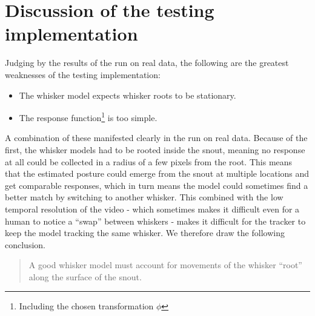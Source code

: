


\section{Discussion of the testing implementation}

Judging by the results of the run on real data, the following are the
greatest weaknesses of the testing implementation:

\begin{itemize}
\item The whisker model expects whisker roots to be stationary.
\item The response function\footnote{Including the chosen
    transformation $\phi$} is too simple.

\end{itemize}

A combination of these manifested clearly in the run on real
data. Because of the first, the whisker models had to be rooted inside
the snout, meaning no response at all could be collected in a radius
of a few pixels from the root. This means that the estimated posture
could emerge from the snout at multiple locations and get comparable
responses, which in turn means the model could sometimes find a better
match by switching to another whisker. This combined with the low
temporal resolution of the video - which sometimes makes it difficult
even for a human to notice a ``swap'' between whiskers - makes it
difficult for the tracker to keep the model tracking the same
whisker. We therefore draw the following conclusion.

\begin{quote}
  A good whisker model must account for movements of the whisker
  ``root'' along the surface of the snout.
\end{quote}






%
%


